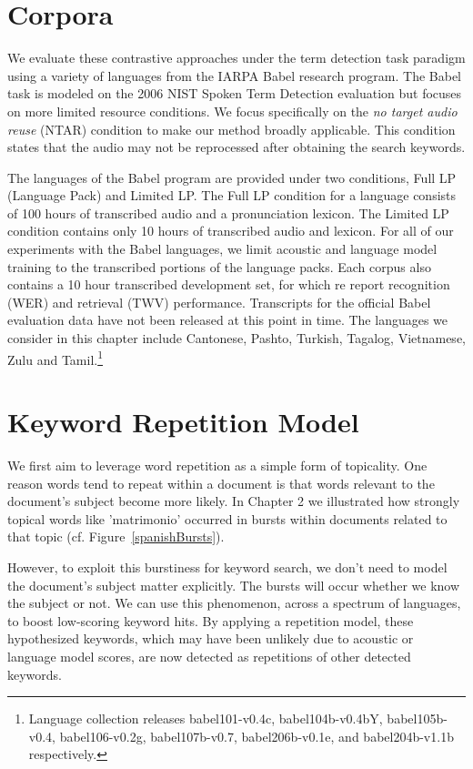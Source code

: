 \section{Corpora}

We evaluate these contrastive approaches under the term detection task paradigm using a variety of languages from the IARPA Babel research program\cite{babel}.   The Babel task is modeled on the 2006 NIST Spoken Term Detection evaluation \cite{std06eval} but focuses on more limited resource conditions.  We focus specifically on the \emph{no target audio reuse} (NTAR) condition to make our method broadly applicable.  This condition states that the audio may not be reprocessed after obtaining the search keywords.   

The languages of the Babel program are provided under two conditions, Full LP (Language Pack) and Limited LP. The Full LP condition for a language consists of 100 hours of transcribed audio and a pronunciation lexicon.  The Limited LP condition contains only 10 hours of transcribed audio and lexicon.  For all of our experiments with the Babel languages, we  limit acoustic and language model training to the transcribed portions of the language packs.  Each corpus also contains a 10 hour transcribed development set, for which re report recognition (WER) and retrieval (TWV) performance.   Transcripts for the official Babel evaluation data have not been released at this point in time.  The languages we consider in this chapter include Cantonese, Pashto, Turkish, Tagalog, Vietnamese, Zulu and Tamil.\footnote{Language collection releases babel101-v0.4c, babel104b-v0.4bY, babel105b-v0.4, babel106-v0.2g, babel107b-v0.7, babel206b-v0.1e, and babel204b-v1.1b respectively.}


\section{Keyword Repetition Model}
\label{sec:repetitionModel}
We first aim to leverage word repetition as a simple form of topicality.  One reason words tend to repeat within a document is that words relevant to the document's subject become more likely.  In Chapter 2 we illustrated how strongly topical words like 'matrimonio' occurred in bursts within documents related to that topic (cf. Figure~\ref{spanishBursts}).  

However, to exploit this burstiness for keyword search, we don't need to model the document's subject matter explicitly.  The bursts will occur whether we know the subject or not.  We can use this phenomenon, across a spectrum of languages, to boost low-scoring keyword hits.  By applying a repetition model, these hypothesized keywords, which may have been unlikely due to acoustic or language model scores, are now detected as repetitions of other detected keywords.

